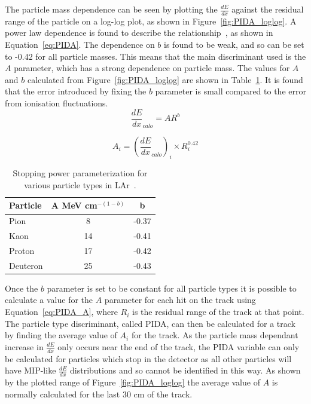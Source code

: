 The particle mass dependence can be seen by plotting the $\frac{dE}{dx}$ against the residual range of the particle on a log-log plot, as shown in Figure~\ref{fig:PIDA_loglog}. A power law dependence is found to describe the relationship~\citep{PIDA_Paper}, as shown in Equation~\ref{eq:PIDA}. The dependence on $b$ is found to be weak, and so can be set to -0.42 for all particle masses. This means that the main discriminant used is the $A$ parameter, which has a strong dependence on particle mass. The values for $A$ and $b$ calculated from Figure~\ref{fig:PIDA_loglog} are shown in Table~\ref{tab:PIDAVals}. It is found that the error introduced by fixing the $b$ parameter is small compared to the error from ionisation fluctuations. \\

\begin{equation}
  \label{eq:PIDA}
  \frac{dE}{dx}_{calo} = A R^b
\end{equation}

\begin{equation}
  \label{eq:PIDA_A}
  A_i = (\frac{dE}{dx}_{calo})_i \times R^{0.42}_i
\end{equation}

\begin{table}
\caption[Stopping power parameterization for various particle types in liquid Argon]
        {Stopping power parameterization for various particle types in LAr~\citep{PIDA_Paper}.}
\centering
\label{tab:PIDAVals}
\begin{tabular}{l c c}
\toprule
{Particle} & {A MeV cm$^{-(1-b)}$} & {b} \\ 
\midrule
Pion     & 8  & -0.37 \\

Kaon     & 14 & -0.41 \\

Proton   & 17 & -0.42 \\

Deuteron & 25 & -0.43 \\
\bottomrule
\end{tabular}
\end{table}

Once the $b$ parameter is set to be constant for all particle types it is possible to calculate a value for the $A$ parameter for each hit on the track using Equation~\ref{eq:PIDA_A}, where $R_i$ is the residual range of the track at that point. The particle type discriminant, called PIDA, can then be calculated for a track by finding the average value of $A_i$ for the track. As the particle mass dependant increase in $\frac{dE}{dx}$ only occurs near the end of the track, the PIDA variable can only be calculated for particles which stop in the detector as all other particles will have MIP-like $\frac{dE}{dx}$ distributions and so cannot be identified in this way. As shown by the plotted range of Figure~\ref{fig:PIDA_loglog} the average value of $A$ is normally calculated for the last 30 cm of the track. \\

